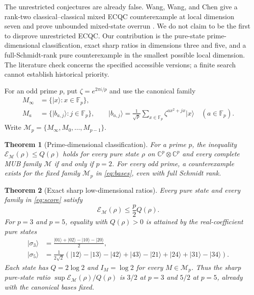 \documentclass[11pt]{article}
\newtheorem{theorem}{Theorem}[section]
\theoremstyle{remark}
\newcommand{\C}{\mathbb C}
\newcommand{\F}{\mathbb F}
\newcommand{\E}{\mathcal E}
\newcommand{\M}{\mathcal M}
\newcommand{\ket}[1]{\lvert #1\rangle}
\begin{document}
The unrestricted conjectures are already false. Wang, Wang, and Chen give a rank-two classical--classical mixed ECQC counterexample at local dimension seven and prove unbounded mixed-state overrun \cite{wang}. We do not claim to be the first to disprove unrestricted ECQC. Our contribution is the pure-state prime-dimensional classification, exact sharp ratios in dimensions three and five, and a full-Schmidt-rank pure counterexample in the smallest possible local dimension. The literature check concerns the specified accessible versions; a finite search cannot establish historical priority.

For an odd prime $p$, put $\zeta=e^{2\pi i/p}$ and use the canonical family
\begin{align}
 M_\infty&=\{\ket{x}:x\in\F_p\},\nonumber\\
 M_a&=\{\ket{b_{a,j}}:j\in\F_p\},\qquad
 \ket{b_{a,j}}=\frac1{\sqrt p}\sum_{x\in\F_p}\zeta^{a x^2+jx}\ket{x}
 \quad(a\in\F_p).\label{eq:bases}
\end{align}
Write $\M_p=\{M_\infty,M_0,\ldots,M_{p-1}\}$.

\begin{theorem}[Prime-dimensional classification]\label{thm:classification}
For a prime $p$, the inequality $\E_\M(\rho)\leq Q(\rho)$ holds for every pure state $\rho$ on $\C^p\otimes\C^p$ and every complete MUB family $\M$ if and only if $p=2$. For every odd prime, a counterexample exists for the fixed family $\M_p$ in \eqref{eq:bases}, even with full Schmidt rank.
\end{theorem}

\begin{theorem}[Exact sharp low-dimensional ratios]\label{thm:sharp}
Every pure state and every family in \eqref{eq:score} satisfy
\begin{equation}\label{eq:universalratio}
 \E_\M(\rho)\leq\frac p2 Q(\rho).
\end{equation}
For $p=3$ and $p=5$, equality with $Q(\rho)>0$ is attained by the real-coefficient pure states
\begin{align}
 \ket{\sigma_3}&=\frac{\ket{01}+\ket{02}-\ket{10}-\ket{20}}2,\label{eq:sigma3}\\
 \ket{\sigma_5}&=\frac{1}{2\sqrt2}
 (\ket{12}-\ket{13}-\ket{42}+\ket{43}
 -\ket{21}+\ket{24}+\ket{31}-\ket{34}).\label{eq:sigma5}
\end{align}
Each state has $Q=2\log2$ and $I_M=\log2$ for every $M\in\M_p$. Thus the sharp pure-state ratio $\sup \E_\M(\rho)/Q(\rho)$ is $3/2$ at $p=3$ and $5/2$ at $p=5$, already with the canonical bases fixed.
\end{theorem}
\end{document}
